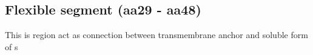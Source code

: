 \subsection{Flexible segment (aa29 - aa48)}

This is region act as connection between transmembrane anchor and soluble form of s

